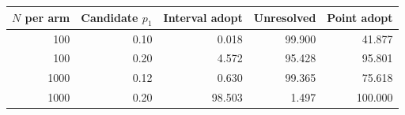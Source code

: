 \begin{tabular}{rrrrr}
\toprule
$N$ per arm & Candidate $p_1$ & Interval adopt & Unresolved & Point adopt\\
\midrule
100 & 0.10 & 0.018 & 99.900 & 41.877\\
100 & 0.20 & 4.572 & 95.428 & 95.801\\
1000 & 0.12 & 0.630 & 99.365 & 75.618\\
1000 & 0.20 & 98.503 & 1.497 & 100.000\\
\bottomrule
\end{tabular}
